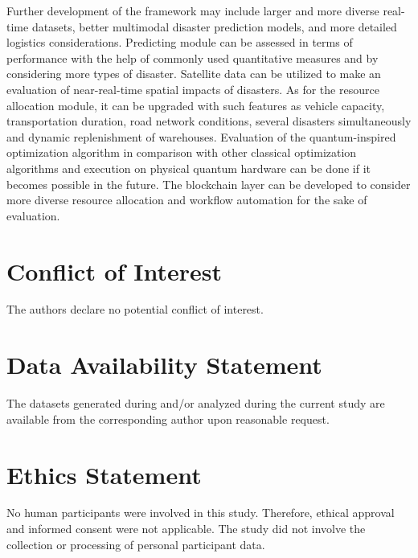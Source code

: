 \documentclass[conference]{IEEEtran}
\begin{document}
Further development of the framework may include larger and more diverse real-time datasets, better multimodal disaster prediction models, and more detailed logistics considerations. Predicting module can be assessed in terms of performance with the help of commonly used quantitative measures and by considering more types of disaster. Satellite data can be utilized to make an evaluation of near-real-time spatial impacts of disasters. As for the resource allocation module, it can be upgraded with such features as vehicle capacity, transportation duration, road network conditions, several disasters simultaneously and dynamic replenishment of warehouses. Evaluation of the quantum-inspired optimization algorithm in comparison with other classical optimization algorithms and execution on physical quantum hardware can be done if it becomes possible in the future. The blockchain layer can be developed to consider more diverse resource allocation and workflow automation for the sake of evaluation.

\section*{Conflict of Interest}
The authors declare no potential conflict of interest.

\section*{Data Availability Statement}
The datasets generated during and/or analyzed during the current study are available from the corresponding author upon reasonable request.

\section*{Ethics Statement}
No human participants were involved in this study. Therefore, ethical approval and informed consent were not applicable. The study did not involve the collection or processing of personal participant data.
\end{document}
